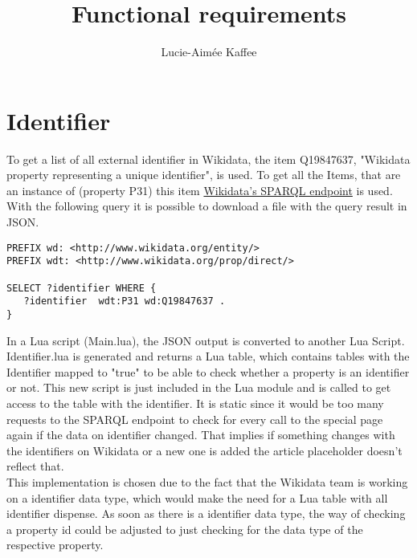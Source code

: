 \documentclass[11pt]{article}
\title {{Functional requirements}}
\author {Lucie-Aim\'{e}e Kaffee}
\date{}
\begin{document}
\section{Identifier}

To get a list of all external identifier in Wikidata, the item Q19847637, "Wikidata property representing a unique identifier", is used. To get all the Items, that are an instance of (property P31) this item \href{https://query.wikidata.org}{Wikidata's SPARQL endpoint} is used. With the following query it is possible to download a file with the query result in JSON. \\

\begin{lstlisting}[frame=single] 
PREFIX wd: <http://www.wikidata.org/entity/>
PREFIX wdt: <http://www.wikidata.org/prop/direct/>

SELECT ?identifier WHERE {
   ?identifier  wdt:P31 wd:Q19847637 . 
}
\end{lstlisting}

In a Lua script (Main.lua), the JSON output is converted to another Lua Script. Identifier.lua is generated and returns a Lua table, which contains tables with the Identifier mapped to "true" to be able to check whether a property is an identifier or not. This new script is just included in the Lua module and is called to get access to the table with the identifier. It is static since it would be too many requests to the SPARQL endpoint to check for every call to the special page again if the data on identifier changed. That implies if something changes with the identifiers on Wikidata or a new one is added the article placeholder doesn't reflect that. \\
This implementation is chosen due to the fact that the Wikidata team is working on a identifier data type, which would make the need for a Lua table with all identifier dispense. As soon as there is a identifier data type, the way of checking a property id could be adjusted to just checking for the data type of the respective property. 
\end{document}
